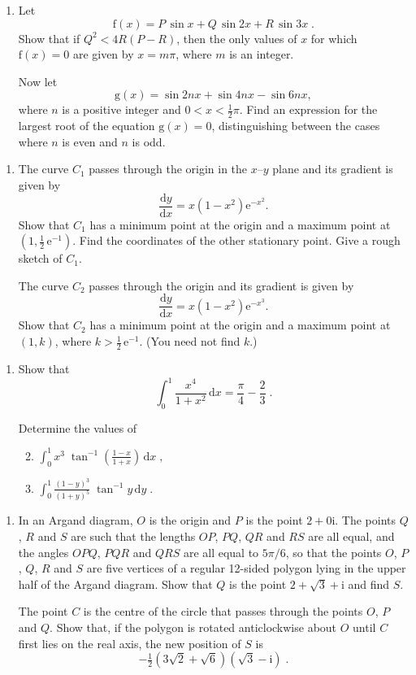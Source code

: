\documentclass[a4, 11pt]{report}
\newlength{\qspace}
\newcounter{qnumber}
\newenvironment{question}%
 {\vspace{\qspace}
  \begin{enumerate}[\bfseries 1\quad][10]%
    \setcounter{enumi}{\value{qnumber}}%
    \item%
 }
{
  \end{enumerate}
  \filbreak
  \stepcounter{qnumber}
 }
\newenvironment{questionparts}[1][1]%
 {
  \begin{enumerate}[\bfseries (i)]%
    \setcounter{enumii}{#1}
    \addtocounter{enumii}{-1}
    \setlength{\itemsep}{5mm}
    \setlength{\parskip}{8pt}
 }
 {
  \end{enumerate}
 }
\def\d{{\mathrm d}}
\def\e{{\mathrm e}}
\def\g{{\mathrm g}}
\def\f{{\mathrm f}}
\begin{document}
\begin{question}
Let
$$
\f(x) = P \, {\sin x} + Q\, {\sin 2x} + R\, {\sin 3x} \;. 
$$
Show that if $Q^2 < 4R(P-R)$, 
then the only values of $x$ for which $\f(x) = 0$ are given by $x=m\pi$, where $m$ is
an integer.
\newline
[You may assume that $\sin 3x  =  \sin x(4\cos^2 x -1)$.]

Now let 
$$
\g(x) =  {\sin 2nx} + {\sin 4nx} - {\sin 6nx},
$$
where $n$ is a positive integer and $0 < x < \frac{1}{2}\pi $.
Find an expression for the largest root of the equation
$\g(x)=0$, distinguishing between the
cases where $n$ is even and $n$ is odd.

\end{question}

\begin{question}
The curve $C_1$ passes through the origin in the $x$--$y$ plane
and its gradient is given by
$$
\frac{\d y}{\d x} =x(1-x^2)\e^{-x^2}.
$$
Show that
$C_1$ has a minimum point at the origin and
a maximum point at 
$\left(1,{\frac12\, \e^{-1}} \right)$. Find the coordinates of the other stationary point.
Give a rough sketch of $C_1$.



The curve $C_2$ passes through the origin and its gradient is given by
$$
\frac{\d y}{\d x}=
x(1-x^2)\e^{-x^3}.
$$
Show that $C_2$ has a minimum point at the origin and a maximum point at $(1,k)$, where \phantom{}
$k >  \frac12 \,\e^{-1}.$ (You need not find $k$.)
	\end{question}
	
\begin{question}
Show that
\[
\int_0^1 \frac{x^4}{1+x^2} \, \d x = \frac \pi {4} - \frac 23 \;.
\]

Determine the values of
\begin{questionparts}
\item $\displaystyle
\int_0^1 x^3 \; \tan ^{-1} \left(\frac {1-x} {1+x} \right) \,\d x \;,
$

\item
$\displaystyle
\int_0^1 \frac {(1-y)^3} {(1+y)^5} \; {{\tan}^{-1} y}\, \d y \;.$
\end{questionparts}

\end{question}
	
\begin{question}
In an Argand diagram, $O$ is the origin and $P$ is the point 
$2+0\mathrm{i}$. The points  $Q$, $R$ and  $S$ are such that
the lengths  $OP$, $PQ$, $QR$ and $RS$ are all equal, and 
the angles $OPQ$, $PQR$ and $QRS$ are all equal to
${5{\pi}}/6$, so that the points $O$, $P$, $Q$, $R$ and $S$ are five vertices of 
a regular 12-sided polygon lying in the upper half of the Argand diagram. 
Show that $Q$ is the point 
$2 + \sqrt 3 + \mathrm{i}$ and find $S$.

The point  $C$ is 
 the centre of the circle that  passes through the points
$O$, $P$ and $Q$. Show that, if the polygon
is  rotated anticlockwise about $O$
until  $C$ first lies on the real axis,  the 
new position of $S$ is
$$
- \tfrac{1}{2}  (3\sqrt 2+ \sqrt6)(\sqrt3-\mathrm{i})\;. 
$$
\end{question}
		
\end{document}

